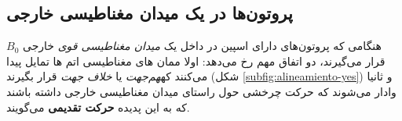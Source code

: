\subsection{پروتون‌ها در یک میدان مغناطیسی خارجی}


هنگامی که پروتون‌های دارای اسپین در داخل یک \textit{میدان مغناطیسی قوی }
خارجی $B_0$ قرار می‌گیرند، دو اتفاق مهم رخ می‌دهد: اولا ممان های مغناطیسی اتم ها تمایل پیدا می‌کنند که\textit{هم‌جهت} یا \textit{خلاف جهت} 
قرار بگیرند (شکل \ref{subfig:alineamiento-yes})
و ثانیا وادار می‌شوند که حرکت چرخشی حول راستای میدان مغناطیسی خارجی داشته باشند که به این پدیده \textbf{حرکت تقدیمی}
می‌گویند. 

\begin{figure}
	\centering{}
	\caption{}
	\label{fig:zeeman-diagram}
\end{figure}


